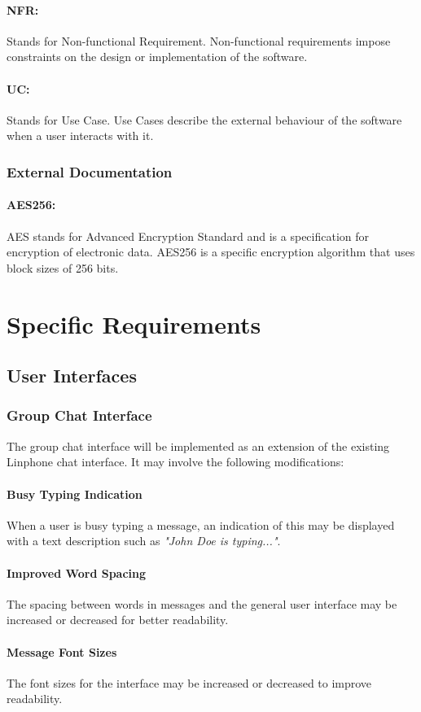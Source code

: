 \documentclass[11pt]{article}
\begin{document}
\paragraph{NFR:} Stands for Non-functional Requirement. Non-functional requirements impose constraints on the design or implementation of the software.
\paragraph{UC:} Stands for Use Case. Use Cases describe the external behaviour of the software when a user interacts with it.
\subsubsection{External Documentation}
\paragraph{AES256:} AES stands for Advanced Encryption Standard and is a specification for encryption of electronic data. AES256 is a specific encryption algorithm that uses block sizes of 256 bits.

\section{Specific Requirements}
\subsection{User Interfaces}
\subsubsection{Group Chat Interface} The group chat interface will be implemented as an extension of the existing Linphone chat interface. It may involve the following modifications:
\paragraph{Busy Typing Indication} When a user is busy typing a message, an indication of this may be displayed with a text description such as \textit{"John Doe is typing..."}.
\paragraph{Improved Word Spacing} The spacing between words in messages and the general user interface may be increased or decreased for better readability.
\paragraph{Message Font Sizes} The font sizes for the interface may be increased or decreased to improve readability.
\end{document}
